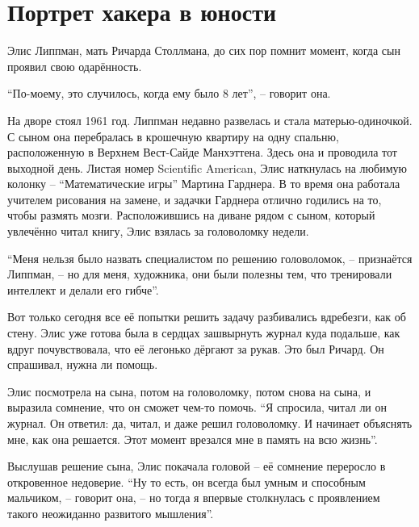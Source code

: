
\chapter{Портрет хакера в юности}

Элис Липпман, мать Ричарда Столлмана, до сих пор помнит момент, когда сын проявил свою одарённость.

\enquote{По-моему, это случилось, когда ему было 8 лет}, -- говорит она.

На дворе стоял 1961 год. Липпман недавно развелась и стала матерью-одиночкой. С сыном она перебралась в крошечную квартиру на одну спальню, расположенную в Верхнем Вест-Сайде Манхэттена. Здесь она и проводила тот выходной день. Листая номер Scientific American, Элис наткнулась на любимую колонку -- \enquote{Математические игры} Мартина Гарднера. В то время она работала учителем рисования на замене, и задачки Гарднера отлично годились на то, чтобы размять мозги. Расположившись на диване рядом с сыном, который увлечённо читал книгу, Элис взялась за головоломку недели.

\enquote{Меня нельзя было назвать специалистом по решению головоломок, -- признаётся Липпман, -- но для меня, художника, они были полезны тем, что тренировали интеллект и делали его гибче}.

Вот только сегодня все её попытки решить задачу разбивались вдребезги, как об стену. Элис уже готова была в сердцах зашвырнуть журнал куда подальше, как вдруг почувствовала, что её легонько дёргают за рукав. Это был Ричард. Он спрашивал, нужна ли помощь.

Элис посмотрела на сына, потом на головоломку, потом снова на сына, и выразила сомнение, что он сможет чем-то помочь. \enquote{Я спросила, читал ли он журнал. Он ответил: да, читал, и даже решил головоломку. И начинает объяснять мне, как она решается. Этот момент врезался мне в память на всю жизнь}.

Выслушав решение сына, Элис покачала головой -- её сомнение переросло в откровенное недоверие. \enquote{Ну то есть, он всегда был умным и способным мальчиком, -- говорит она, -- но тогда я впервые столкнулась с проявлением такого неожиданно развитого мышления}.

